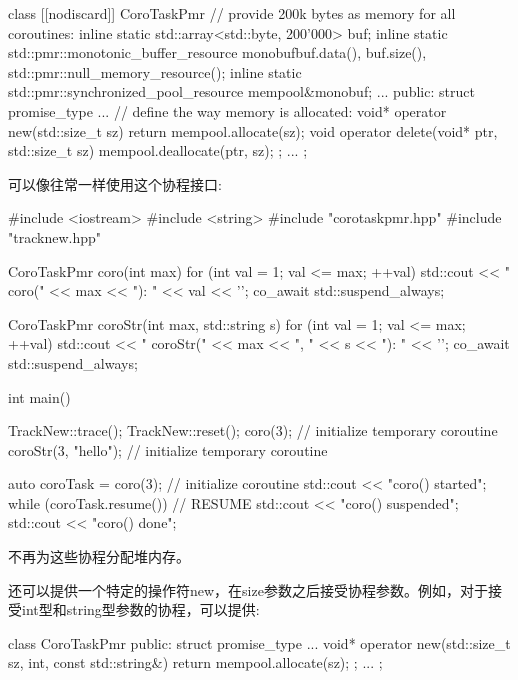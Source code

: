 \begin{cpp}
class [[nodiscard]] CoroTaskPmr {
	// provide 200k bytes as memory for all coroutines:
	inline static std::array<std::byte, 200’000> buf;
	inline static std::pmr::monotonic_buffer_resource
		monobuf{buf.data(), buf.size(), std::pmr::null_memory_resource()};
	inline static std::pmr::synchronized_pool_resource mempool{&monobuf};
	...
public:
	struct promise_type {
		...
			// define the way memory is allocated:
		void* operator new(std::size_t sz) {
			return mempool.allocate(sz);
		}
		void operator delete(void* ptr, std::size_t sz) {
			mempool.deallocate(ptr, sz);
		}
	};
	...
};
\end{cpp}

可以像往常一样使用这个协程接口:


\begin{cpp}
#include <iostream>
#include <string>
#include "corotaskpmr.hpp"
#include "tracknew.hpp"

CoroTaskPmr coro(int max)
{
	for (int val = 1; val <= max; ++val) {
		std::cout << "    coro(" << max << "): " << val << '\n';
		co_await std::suspend_always{};
	}
}

CoroTaskPmr coroStr(int max, std::string s)
{
	for (int val = 1; val <= max; ++val) {
		std::cout << "    coroStr(" << max << ", " << s << "): " << '\n';
		co_await std::suspend_always{};
	}
}

int main()
{
	TrackNew::trace();
	TrackNew::reset();
	coro(3); // initialize temporary coroutine
	coroStr(3, "hello"); // initialize temporary coroutine

	auto coroTask = coro(3); // initialize coroutine
	std::cout << "coro() started\n";
	while (coroTask.resume()) { // RESUME
		std::cout << "coro() suspended\n";
	}
	std::cout << "coro() done\n";
}
\end{cpp}

不再为这些协程分配堆内存。

还可以提供一个特定的操作符new，在size参数之后接受协程参数。例如，对于接受int型和string型参数的协程，可以提供:

\begin{cpp}
class CoroTaskPmr {
	public:
	struct promise_type {
		...
		void* operator new(std::size_t sz, int, const std::string&) {
			return mempool.allocate(sz);
		}
	};
	...
};
\end{cpp}


